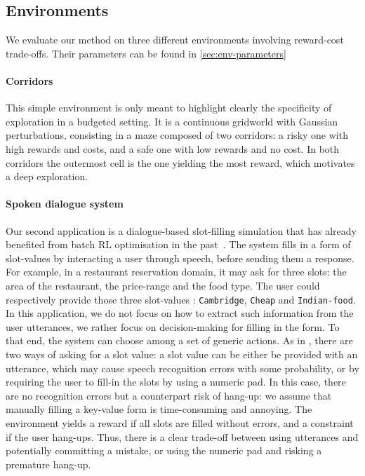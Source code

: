 \subsection{Environments}
\label{subsec:environments}
We evaluate our method on three different environments involving reward-cost trade-offs. Their parameters can be found in \autoref{sec:env-parameters}

\paragraph{Corridors}
This simple environment is only meant to highlight clearly the specificity of exploration in a budgeted setting. It is a continuous gridworld with Gaussian perturbations, consisting in a maze composed of two corridors: a risky one with high rewards and costs, and a safe one with low rewards and no cost. In both corridors the outermost cell is the one yielding the most reward, which motivates a deep exploration.

\paragraph{Spoken dialogue system}
Our second application is a dialogue-based slot-filling simulation that has already benefited from batch RL optimisation in the past~\citep{Li2009ReinforcementLF,chandramohan2010optimizing,pietquin2011sample}. The system fills in a form of slot-values by interacting a user through speech, before sending them a response. For example, in a restaurant reservation domain, it may ask for three slots: the area of the restaurant, the price-range and the food type. The user could respectively provide those three slot-values : \texttt{Cambridge}, \texttt{Cheap} and \texttt{Indian-food}. In this application, we do not focus on how to extract such information from the user utterances, we rather focus on decision-making for filling in the form. To that end, the system can choose among a set of generic actions. As in \citep{carrara2018safe}, there are two ways of asking for a slot value: a slot value can be either be provided with an utterance, which may cause speech recognition errors with some probability, or by requiring the user to fill-in the slots by using a numeric pad. In this case, there are no recognition errors but a counterpart risk of hang-up: we assume that manually filling a key-value form is time-consuming and annoying. The environment yields a reward if all slots are filled without errors, and a constraint if the user hang-ups. Thus, there is a clear trade-off between using utterances and potentially committing a mistake, or using the numeric pad and risking a premature hang-up.

